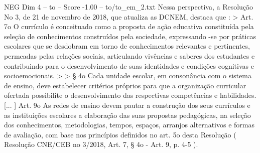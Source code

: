 \begin{textsample}{NEG Dim 4 – to – Score -1.00 – to/to\_em\_2.txt}
Nessa perspectiva, a Resolução No 3, de 21 de novembro de 2018, que atualiza as DCNEM, destaca que : > Art. 7o O currículo é conceituado como a proposta de ação educativa constituída pela seleção de conhecimentos construídos pela sociedade, expressando -se por práticas escolares que se desdobram em torno de conhecimentos relevantes e pertinentes, permeadas pelas relações sociais, articulando vivências e saberes dos estudantes e contribuindo para o desenvolvimento de suas identidades e condições cognitivas e socioemocionais. > > § 4o Cada unidade escolar, em consonância com o sistema de ensino, deve estabelecer critérios próprios para que a organização curricular ofertada possibilite o desenvolvimento das respectivas competências e habilidades. [... ] Art. 9o As redes de ensino devem pautar a construção dos seus currículos e as instituições escolares a elaboração das suas propostas pedagógicas, na seleção dos conhecimentos, metodologias, tempos, espaços, arranjos alternativos e formas de avaliação, com base nos princípios definidos no art. 5o desta Resolução ( Resolução CNE/CEB no 3/2018, Art. 7, § 4o - Art. 9, p. 4-5 ).

\end{textsample}
